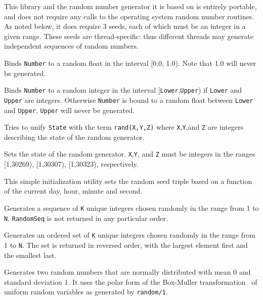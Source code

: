 This library and the random number generator it is based on is
entirely portable, and does not require any calls to the operating
system random number routines.  As noted below, it does require 3
seeds, each of which must be an integer in a given range.  These seeds
are thread-specific: thus different threads may generate independent
sequences of random numbers.


\begin{description}

%
Binds \texttt{Number} to a random float in the interval [0.0, 1.0).
Note that 1.0 will never be generated.

    Binds \texttt{Number} to a random integer in the interval
    [\texttt{Lower},\texttt{Upper}) if \texttt{Lower} and \texttt{Upper}
    are integers.  Otherwise \texttt{Number} is bound to a random float
    between \texttt{Lower} and \texttt{Upper}.  \texttt{Upper} will
    never be generated.

    Tries to unify \texttt{State} with the term \texttt{rand(X,Y,Z)}
    where \texttt{X},\texttt{Y},and \texttt{Z} are integers describing
    the state of the random generator.

    Sets the state of the random generator.  \texttt{X},\texttt{Y}, and
    \texttt{Z} must be integers in the ranges [1,30269), [1,30307),
    [1,30323), respectively.

This simple initialization utility sets the random seed triple based on a
function of the current day, hour, minute and second. 

    Generates a sequence of \texttt{K} unique integers chosen randomly
    in the range from 1 to \texttt{N}.  \texttt{RandomSeq} is not
    returned in any particular order.

    Generates an ordered set of \texttt{K} unique integers chosen
    randomly in the range from 1 to \texttt{N}.  The set is returned in
    reversed order, with the largest element first and the smallest
    last.

%
Generates two random numbers that are normally distributed with mean 0
and standard deviation 1.  It uses the polar form of the Box-Muller
transformation~\cite{BoxM58} of uniform random variables as generated by
{\tt random/1}.


\end{description}
